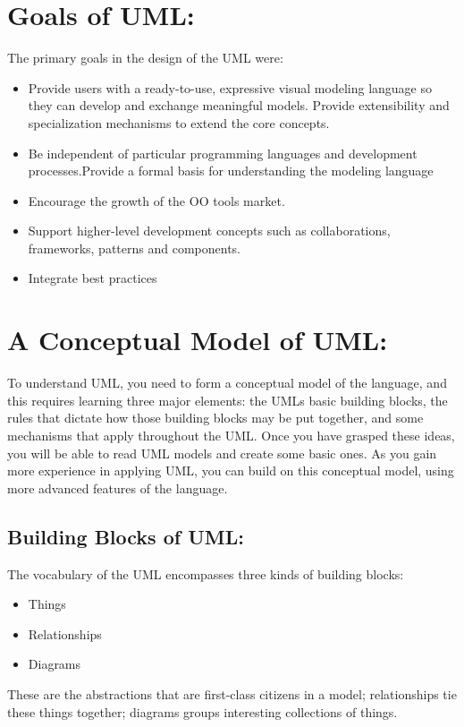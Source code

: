 \section{Goals of UML: }
The primary goals in the design of the UML were:
\begin{itemize}
\item Provide users with a ready-to-use, expressive visual modeling language so they can develop and exchange meaningful models. Provide extensibility and specialization mechanisms to extend the core concepts.
\item Be independent of particular programming languages and development processes.Provide a formal basis for understanding the modeling language
\item Encourage the growth of the OO tools market.
\item Support higher-level development concepts such as collaborations, frameworks, patterns and components.
\item Integrate best practices
\end{itemize}

\section{A Conceptual Model of  UML: }
To understand UML, you need to form a conceptual model of the language, and this requires learning three major elements: the UMLs basic building blocks, the rules that dictate how those building blocks may be put together, and some mechanisms that apply throughout the UML. Once you have grasped these ideas, you will be able to read UML models and create some basic ones. As you gain more experience in applying UML, you can build on this conceptual model, using more advanced features of the language.

\subsection{Building Blocks of  UML: }
The vocabulary of the UML encompasses three kinds of building blocks:
\begin{itemize}
\item Things
\item Relationships
\item Diagrams
\end {itemize}
These are the abstractions that are first-class citizens in a model; relationships tie these things together; diagrams groups interesting collections of things.

